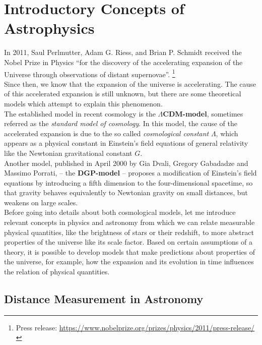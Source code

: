\chapter{Introductory Concepts of Astrophysics}
\label{chap:introductory-concepts-of-astrophysics}
\thispagestyle{empty}

In 2011, Saul Perlmutter, Adam G. Riess, and Brian P. Schmidt received the Nobel Prize in Physics \enquote{for the discovery of the accelerating expansion of the Universe through observations of distant supernovae}. \footnote{Press release: \href{https://www.nobelprize.org/prizes/physics/2011/press-release/}{https://www.nobelprize.org/prizes/physics/2011/press-release/}} \\
Since then, we know that the expansion of the universe is accelerating.
The cause of this accelerated expansion is still unknown, but there are some theoretical models which attempt to explain this phenomenon. \\

\noindent The established model in recent cosmology is the \textbf{$\Lambda$CDM-model}, sometimes referred as the \textit{standard model of cosmology}.
In this model, the cause of the accelerated expansion is due to the so called \textit{cosmological constant} $\Lambda$, which appears as a physical constant in Einstein's field equations of general relativity like the Newtonian gravitational constant $G$. \\

\noindent Another model, published in April 2000 by Gia Dvali, Gregory Gabadadze and Massimo Porrati, -- the \textbf{DGP-model} -- proposes a modification of Einstein's field equations by introducing a fifth dimension to the four-dimensional spacetime, so that gravity behaves equivalently to Newtonian gravity on small distances, but weakens on large scales. \\


\noindent Before going into details about both cosmological models, let me introduce relevant concepts in physics and astronomy from which we can relate measurable physical quantities, like the brightness of stars or their redshift, to more abstract properties of the universe like its scale factor. Based on certain assumptions of a theory, it is possible to develop models that make predictions about properties of the universe, for example, how the expansion and its evolution in time influences the relation of physical quantities.



\section{Distance Measurement in Astronomy}

